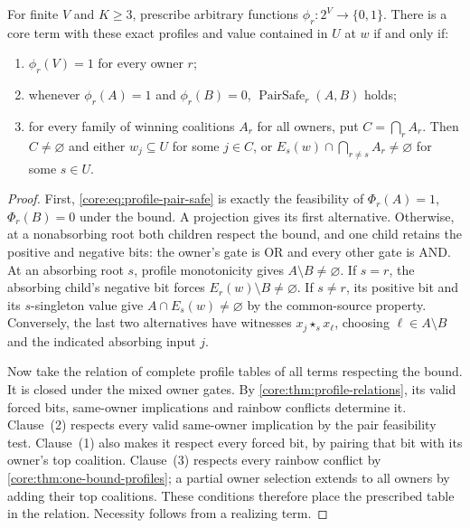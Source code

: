 \begin{theorem}\label{core:thm:bounded-profiles}
For finite $V$ and $K\geq3$, prescribe arbitrary functions
$\phi_r:2^V\to\{0,1\}$. There is a core term with these exact profiles
and value contained in $U$ at $w$ if and only if:
\begin{enumerate}
\item $\phi_r(V)=1$ for every owner $r$;
\item whenever $\phi_r(A)=1$ and $\phi_r(B)=0$,
  $\operatorname{PairSafe}_r(A,B)$ holds;
\item for every family of winning coalitions $A_r$ for all owners, put
  $C=\bigcap_r A_r$. Then $C\ne\varnothing$ and either
  $w_j\subseteq U$ for some $j\in C$, or
  $E_s(w)\cap\bigcap_{r\ne s}A_r\ne\varnothing$ for some $s\in U$.
\end{enumerate}
\end{theorem}
\begin{proof}
First, \eqref{core:eq:profile-pair-safe} is exactly the feasibility of
$\Phi_r(A)=1$, $\Phi_r(B)=0$ under the bound. A projection gives its first
alternative. Otherwise, at a nonabsorbing root both children respect the
bound, and one child retains the positive and negative bits: the owner's
gate is OR and every other gate is AND. At an absorbing root $s$, profile
monotonicity gives $A\setminus B\ne\varnothing$. If $s=r$, the absorbing
child's negative bit forces $E_r(w)\setminus B\ne\varnothing$. If
$s\ne r$, its positive bit and its $s$-singleton value give
$A\cap E_s(w)\ne\varnothing$ by the common-source property. Conversely,
the last two alternatives have witnesses $x_j\star_s x_\ell$, choosing
$\ell\in A\setminus B$ and the indicated absorbing input $j$.

Now take the relation of complete profile tables of all terms respecting
the bound. It is closed under the mixed owner gates. By
\cref{core:thm:profile-relations}, its valid forced bits, same-owner
implications and rainbow conflicts determine it. Clause~(2) respects every
valid same-owner implication by the pair feasibility test. Clause~(1)
also makes it respect every forced bit, by pairing that bit with its
owner's top coalition. Clause~(3) respects every rainbow conflict by
\cref{core:thm:one-bound-profiles}; a partial owner selection extends to
all owners by adding their top coalitions. These conditions therefore
place the prescribed table in the relation. Necessity follows from a
realizing term.
\end{proof}

